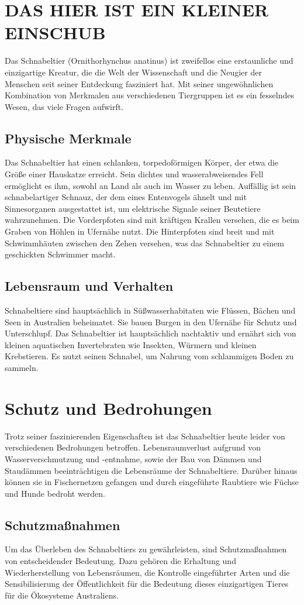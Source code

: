 \section{DAS HIER IST EIN KLEINER EINSCHUB}
    Das Schnabeltier (Ornithorhynchus anatinus) ist zweifellos eine erstaunliche und einzigartige Kreatur, die die Welt der Wissenschaft und die Neugier der Menschen seit seiner Entdeckung fasziniert hat. Mit seiner ungewöhnlichen Kombination von Merkmalen aus verschiedenen Tiergruppen ist es ein fesselndes Wesen, das viele Fragen aufwirft.

    \subsection{Physische Merkmale}
        Das Schnabeltier hat einen schlanken, torpedoförmigen Körper, der etwa die Größe einer Hauskatze erreicht. Sein dichtes und wasserabweisendes Fell ermöglicht es ihm, sowohl an Land als auch im Wasser zu leben. Auffällig ist sein schnabelartiger Schnauz, der dem eines Entenvogels ähnelt und mit Sinnesorganen ausgestattet ist, um elektrische Signale seiner Beutetiere wahrzunehmen. Die Vorderpfoten sind mit kräftigen Krallen versehen, die es beim Graben von Höhlen in Ufernähe nutzt. Die Hinterpfoten sind breit und mit Schwimmhäuten zwischen den Zehen versehen, was das Schnabeltier zu einem geschickten Schwimmer macht.

    \subsection{Lebensraum und Verhalten}
        Schnabeltiere sind hauptsächlich in Süßwasserhabitaten wie Flüssen, Bächen und Seen in Australien beheimatet. Sie bauen Burgen in den Ufernähe für Schutz und Unterschlupf. Das Schnabeltier ist hauptsächlich nachtaktiv und ernährt sich von kleinen aquatischen Invertebraten wie Insekten, Würmern und kleinen Krebstieren. Es nutzt seinen Schnabel, um Nahrung vom schlammigen Boden zu sammeln.

\section{Schutz und Bedrohungen}
    Trotz seiner faszinierenden Eigenschaften ist das Schnabeltier heute leider von verschiedenen Bedrohungen betroffen. Lebensraumverlust aufgrund von Wasserverschmutzung und -entnahme, sowie der Bau von Dämmen und Staudämmen beeinträchtigen die Lebensräume der Schnabeltiere. Darüber hinaus können sie in Fischernetzen gefangen und durch eingeführte Raubtiere wie Füchse und Hunde bedroht werden.

    \subsection{Schutzmaßnahmen}
    Um das Überleben des Schnabeltiers zu gewährleisten, sind Schutzmaßnahmen von entscheidender Bedeutung. Dazu gehören die Erhaltung und Wiederherstellung von Lebensräumen, die Kontrolle eingeführter Arten und die Sensibilisierung der Öffentlichkeit für die Bedeutung dieses einzigartigen Tieres für die Ökosysteme Australiens.
